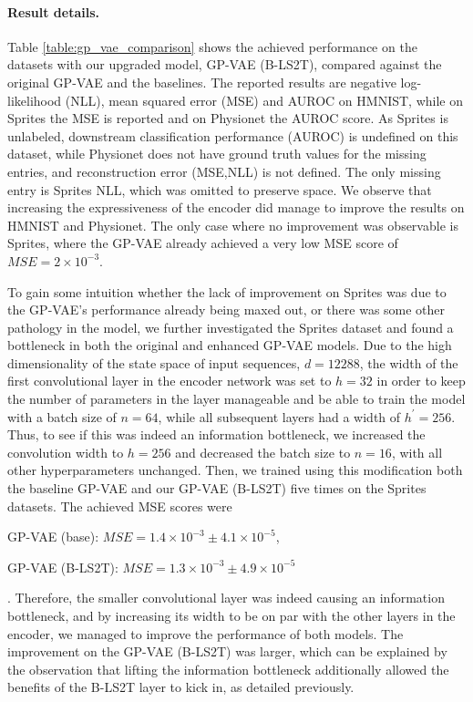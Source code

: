 \documentclass{article} \usepackage{iclr2021_conference,times}
\theoremstyle{plain}
\theoremstyle{definition}
\begin{document}
\paragraph{Result details.} Table \ref{table:gp_vae_comparison} shows the achieved performance on the datasets with our upgraded model, GP-VAE (B-LS2T), compared against the original GP-VAE \citep{fortuin2019gpvae} and the baselines. The reported results are negative log-likelihood (NLL), mean squared error (MSE) and AUROC on HMNIST, while on Sprites the MSE is reported and on Physionet the AUROC score. As Sprites is unlabeled, downstream classification performance (AUROC) is undefined on this dataset, while Physionet does not have ground truth values for the missing entries, and reconstruction error (MSE,NLL) is not defined. The only missing entry is Sprites NLL, which was omitted to preserve space. We observe that increasing the expressiveness of the encoder did manage to improve the results on HMNIST and Physionet. The only case where no improvement was observable is Sprites, where the GP-VAE already achieved a very low MSE score of $MSE = 2 \times 10^{-3}$.

To gain some intuition whether the lack of improvement on Sprites was due to the GP-VAE's performance already being maxed out, or there was some other pathology in the model, we further investigated the Sprites dataset and found a bottleneck in both the original and enhanced GP-VAE models. Due to the high dimensionality of the state space of input sequences, $d = 12288$, the width of the first convolutional layer in the encoder network was set to $h = 32$ in order to keep the number of parameters in the layer manageable and be able to train the model with a batch size of $n = 64$, while all subsequent layers had a width of $h^\prime = 256$. Thus, to see if this was indeed an information bottleneck, we increased the convolution width to $h = 256$ and decreased the batch size to $n = 16$, with all other hyperparameters unchanged. Then, we trained using this modification both the baseline GP-VAE and our GP-VAE (B-LS2T) five times on the Sprites datasets. The achieved MSE scores were \begin{enumerate*}[label=(\roman*)] \item GP-VAE (base): $MSE = 1.4 \times 10^{-3} \pm  4.1 \times 10^{-5}$, \item GP-VAE (B-LS2T): $MSE = 1.3 \times 10^{-3} \pm 4.9 \times 10^{-5}$\end{enumerate*}. Therefore, the smaller convolutional layer was indeed causing an information bottleneck, and by increasing its width to be on par with the other layers in the encoder, we managed to improve the performance of both models. The improvement on the GP-VAE (B-LS2T) was larger, which can be explained by the observation that lifting the information bottleneck additionally allowed the benefits of the B-LS2T layer to kick in, as detailed previously.
\end{document}

